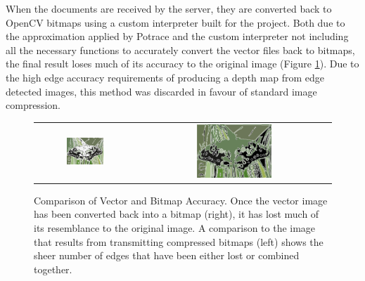 When the documents are received by the server, they are converted back to OpenCV bitmaps using a custom interpreter built for the project. Both due to the approximation applied by Potrace and the custom interpreter not including all the necessary functions to accurately convert the vector files back to bitmaps, the final result loses much of its accuracy to the original image (Figure \ref{fig:potracecomp}). Due to the high edge accuracy requirements of producing a depth map from edge detected images, this method was discarded in favour of standard image compression. 

\begin{figure}[H]
    \begin{center}
    \begin{tabular}{ c c }
        \includegraphics[width=0.4\textwidth]{Figures/buttercan.jpg} &
        \includegraphics[width=0.4\textwidth]{Figures/butterred.jpg}
    \end{tabular}
    \caption[Comparison of Vector and Bitmap Accuracy]{Comparison of Vector and Bitmap Accuracy. Once the vector image has been converted back into a bitmap (right), it has lost much of its resemblance to the original image. A comparison to the image that results from transmitting compressed bitmaps (left) shows the sheer number of edges that have been either lost or combined together.}
    \label{fig:potracecomp}
    \end{center}
\end{figure}